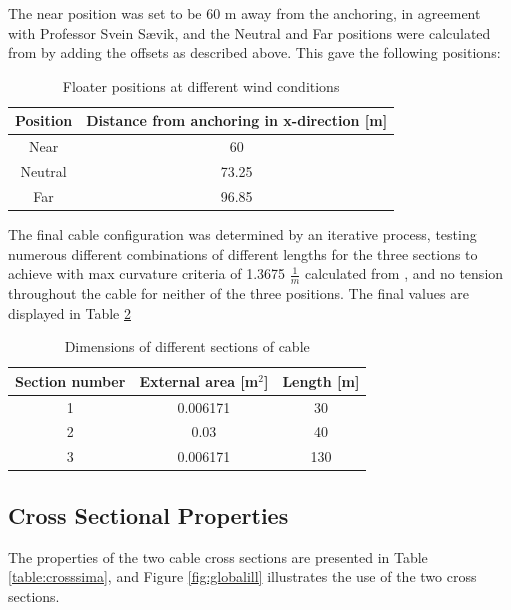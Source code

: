 \noindent The near position was set to be 60 m away from the anchoring, in agreement with Professor Svein Sævik, and the Neutral and Far positions were calculated from by adding the offsets as described above. This gave the following positions: 
\begin{table} [H]
\centering
\begin{tabular}{ |c|c|}
\hline
Position & Distance from anchoring in x-direction [m] \\
 \hline
 \hline
 
Near & 60\\

Neutral & 73.25\\

Far & 96.85 \\
 
 \hline
\end{tabular}
\caption{Floater positions at different wind conditions}
\label{table:pos}
\end{table}

\noindent The final cable configuration was determined by an iterative process, testing numerous different combinations of different lengths for the three sections to achieve with max curvature criteria of 1.3675 $\frac{1}{m}$ calculated from \cite{API2014}, and no tension throughout the cable for neither of the three positions. The final values are displayed in Table \ref{table:DIMCABLE} 
\begin{table} [H]
\centering
\begin{tabular}{ |c|c|c|}
\hline
Section number & External area [m$^2$] & Length [m] \\
 \hline
 \hline
1 & 0.006171 & 30\\
2 & 0.03 & 40\\
3 & 0.006171 & 130\\
 \hline
\end{tabular}
\caption{Dimensions of different sections of cable}
\label{table:DIMCABLE}
\end{table}

\subsection{Cross Sectional Properties}
The properties of the two cable cross sections are presented in Table \ref{table:crosssima}, and Figure \ref{fig:globalill} illustrates the use of the two cross sections.

